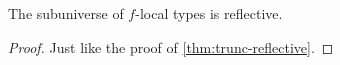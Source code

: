 \begin{thm}\label{thm:local-reflective}
  The subuniverse of $f$-local types is reflective.
\end{thm}
\begin{proof}
  Just like the proof of \autoref{thm:trunc-reflective}.
\end{proof}


